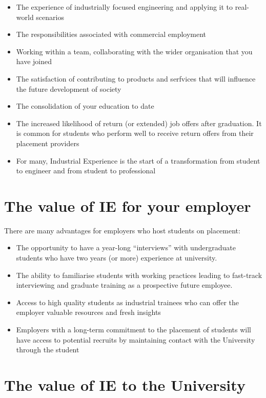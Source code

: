 \documentclass[
]{book}
\providecommand{\tightlist}{%
  \setlength{\itemsep}{0pt}\setlength{\parskip}{0pt}}
\begin{document}
\begin{itemize}
\tightlist
\item
  The experience of industrially focused engineering and applying it to real-world scenarios
\item
  The responsibilities associated with commercial employment
\item
  Working within a team, collaborating with the wider organisation that you have joined
\item
  The satisfaction of contributing to products and serfvices that will influence the future development of society
\item
  The consolidation of your education to date
\item
  The increased likelihood of return (or extended) job offers after graduation. It is common for students who perform well to receive return offers from their placement providers
\item
  For many, Industrial Experience is the start of a transformation from student to engineer and from student to professional
\end{itemize}

\section{The value of IE for your employer}\label{evalue}

There are many advantages for employers who host students on placement:

\begin{itemize}
\tightlist
\item
  The opportunity to have a year-long ``interviews'' with undergraduate students who have two years (or more) experience at university.
\item
  The ability to familiarise students with working practices leading to fast-track interviewing and graduate training as a prospective future employee.
\item
  Access to high quality students as industrial trainees who can offer the employer valuable resources and fresh insights
\item
  Employers with a long-term commitment to the placement of students will have access to potential recruits by maintaining contact with the University through the student
\end{itemize}

\section{The value of IE to the University}\label{uvalue}
\end{document}
